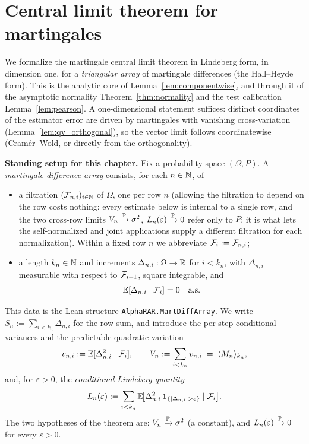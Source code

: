 \chapter{Central limit theorem for martingales}
\label{chap:pre_clt}

We formalize the martingale central limit theorem in Lindeberg form, in dimension
one, for a \emph{triangular array} of martingale differences (the Hall--Heyde
form). This is the analytic core of Lemma~\ref{lem:componentwise}, and through it
of the asymptotic normality Theorem~\ref{thm:normality} and the test calibration
Lemma~\ref{lem:pearson}. A one-dimensional statement suffices: distinct
coordinates of the estimator error are driven by martingales with vanishing
cross-variation (Lemma~\ref{lem:qv_orthogonal}), so the vector limit follows
coordinatewise (Cram\'er--Wold, or directly from the orthogonality).

\medskip

\textbf{Standing setup for this chapter.} Fix a probability space $(\Omega,P)$.
A \emph{martingale difference array} consists, for each $n\in\mathbb{N}$, of
\begin{itemize}
  \item a filtration $(\mathcal{F}_{n,i})_{i\in\mathbb{N}}$ of $\Omega$, one per row $n$ (allowing
        the filtration to depend on the row costs nothing: every estimate below is
        internal to a single row, and the two cross-row limits
        $V_n\xrightarrow{\mathbb{P}}\sigma^2$, $L_n(\varepsilon)\xrightarrow{\mathbb{P}}0$ refer
        only to $P$; it is what lets the self-normalized and joint applications supply a
        different filtration for each normalization). Within a fixed row $n$ we
        abbreviate $\mathcal{F}_i:=\mathcal{F}_{n,i}$;
  \item a length $k_n\in\mathbb{N}$ and increments $\Delta_{n,i}:\Omega\to\mathbb{R}$ for $i<k_n$,
        with $\Delta_{n,i}$ measurable with respect to $\mathcal{F}_{i+1}$, square
        integrable, and
        \[
          \mathbb{E}[\Delta_{n,i}\mid\mathcal{F}_{i}] = 0 \quad\text{a.s.}
        \]
\end{itemize}
This data is the Lean structure \texttt{AlphaRAR.MartDiffArray}. We write
$S_n := \sum_{i<k_n}\Delta_{n,i}$ for the row sum, and introduce the per-step
conditional variances and the predictable quadratic variation
\[
  v_{n,i} := \mathbb{E}[\Delta_{n,i}^2\mid\mathcal{F}_{i}], \qquad
  V_n := \sum_{i<k_n} v_{n,i} \;=\; \langle M_n\rangle_{k_n},
\]
and, for $\varepsilon>0$, the \emph{conditional Lindeberg quantity}
\[
  L_n(\varepsilon) := \sum_{i<k_n}
    \E\!\big[\Delta_{n,i}^2\,\indic_{\{|\Delta_{n,i}|>\varepsilon\}}\mid\filt_{i}\big].
\]
The two hypotheses of the theorem are: $V_n\xrightarrow{\mathbb{P}}\sigma^2$ (a
constant), and $L_n(\varepsilon)\xrightarrow{\mathbb{P}}0$ for every $\varepsilon>0$.

